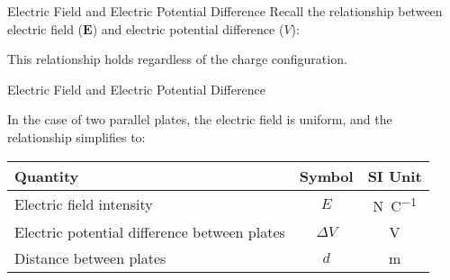 \documentclass[12pt,aspectratio=169]{beamer}
\begin{document}
\begin{frame}{Electric Field and Electric Potential Difference}
  Recall the relationship between electric field ($\bm{E}$) and electric
  potential difference ($V$):
    
  
  This relationship holds regardless of the charge configuration.
\end{frame}




\begin{frame}{Electric Field and Electric Potential Difference}
  \begin{center}
  \end{center}
  In the case of two parallel plates, the electric field is uniform, and the
  relationship simplifies to:

  \begin{center}
    \begin{tabular}{l|c|c}
      \rowcolor{pink}
      \textbf{Quantity} & \textbf{Symbol} & \textbf{SI Unit} \\ \hline
      Electric field intensity & $E$ & \si{\newton\per\coulomb}\\
      Electric potential difference between plates & $\Delta V$ &
      \si{\volt} \\
      Distance between plates       & $d$ & \si{\metre}
    \end{tabular}
  \end{center}
\end{frame}
\end{document}
